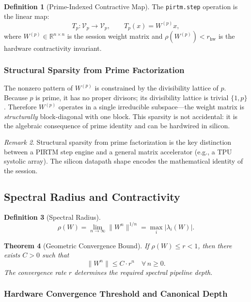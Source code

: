 \documentclass[12pt,letterpaper]{article}
\theoremstyle{plain}
\newtheorem{theorem}{Theorem}[section]
\theoremstyle{definition}
\newtheorem{definition}[theorem]{Definition}
\theoremstyle{remark}
\newtheorem{remark}[theorem]{Remark}
\begin{document}
\begin{definition}[Prime-Indexed Contractive Map]
The \texttt{pirtm.step} operation is the linear map:
\[
  T_p : \mathcal{V}_p \to \mathcal{V}_p, \qquad T_p(x) = W^{(p)} x,
\]
where \(W^{(p)} \in \mathbb{R}^{n \times n}\) is the session weight matrix and
\(\rho(W^{(p)}) < r_{\mathrm{hw}}\) is the hardware contractivity invariant.
\end{definition}

\subsubsection{Structural Sparsity from Prime Factorization}

The nonzero pattern of \(W^{(p)}\) is constrained by the divisibility lattice
of \(p\). Because \(p\) is prime, it has no proper divisors; its divisibility
lattice is trivial \(\{1, p\}\). Therefore \(W^{(p)}\) operates in a single
irreducible subspace---the weight matrix is \emph{structurally} block-diagonal
with one block. This sparsity is not accidental: it is the algebraic consequence
of prime identity and can be hardwired in silicon.

\begin{remark}
Structural sparsity from prime factorization is the key distinction between a
PIRTM step engine and a general matrix accelerator (e.g., a TPU systolic array).
The silicon datapath shape encodes the mathematical identity of the session.
\end{remark}

\subsection{Spectral Radius and Contractivity}

\begin{definition}[Spectral Radius]
\[
  \rho(W) = \lim_{n \to \infty} \|W^n\|^{1/n} = \max_i |\lambda_i(W)|.
\]
\end{definition}

\begin{theorem}[Geometric Convergence Bound]
If \(\rho(W) \leq r < 1\), then there exists \(C > 0\) such that
\[
  \|W^n\| \leq C \cdot r^n \quad \forall\, n \geq 0.
\]
The convergence rate \(r\) determines the required spectral pipeline depth.
\end{theorem}

\subsubsection{Hardware Convergence Threshold and Canonical Depth}
\end{document}
